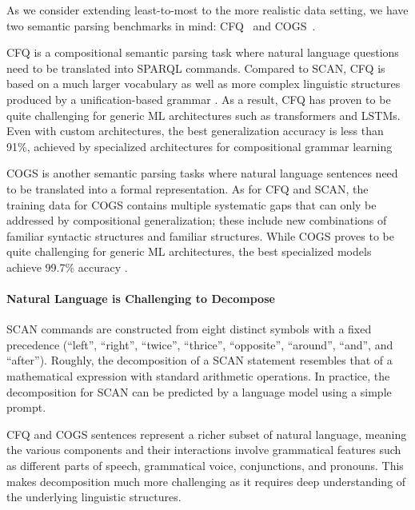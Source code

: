 \documentclass{article} \usepackage{iclr2022_conference,times}
\begin{document}
As we consider extending least-to-most to the more realistic data setting, we have two semantic parsing benchmarks in mind: 
CFQ~\citep{Keysers2020MeasuringCG} and COGS~\citep{kim-linzen-2020-cogs}.

CFQ is a compositional semantic parsing task where natural language questions need to be translated into SPARQL commands. Compared to SCAN, CFQ is based on a much larger vocabulary as well as more complex linguistic structures produced by a unification-based grammar \citep{shieber2003introduction}. As a result, CFQ has proven to be quite challenging for generic ML architectures such as transformers and LSTMs. Even with custom architectures, the best generalization accuracy is less than 91\%, achieved by specialized architectures for compositional grammar learning~\citep{liu-etal-2021-learning-algebraic}

COGS is another semantic parsing tasks where natural language sentences need to be translated into a formal representation. As for CFQ and SCAN, the training data for COGS contains multiple systematic gaps that can only be addressed by compositional generalization; these include new combinations of familiar syntactic structures and familiar structures. While COGS proves to be quite challenging for generic ML architectures, the best specialized models achieve 99.7\% accuracy \citep{qiu-etal-2022-improving}. 


\paragraph{Natural Language is Challenging to Decompose}
SCAN commands are constructed from  eight distinct symbols with a fixed precedence (``left'', ``right'', ``twice'', ``thrice'', ``opposite'', ``around'', ``and'', and ``after''). Roughly, the decomposition of a SCAN statement resembles that of a mathematical expression with standard arithmetic operations. In practice, the decomposition for SCAN can be predicted by a language model using a simple prompt.

CFQ and COGS sentences represent a richer subset of natural language, meaning the various components and their interactions involve grammatical features such as different parts of speech, grammatical voice, conjunctions, and pronouns. This makes decomposition much more challenging as it requires deep understanding of the underlying linguistic structures.
\end{document}
